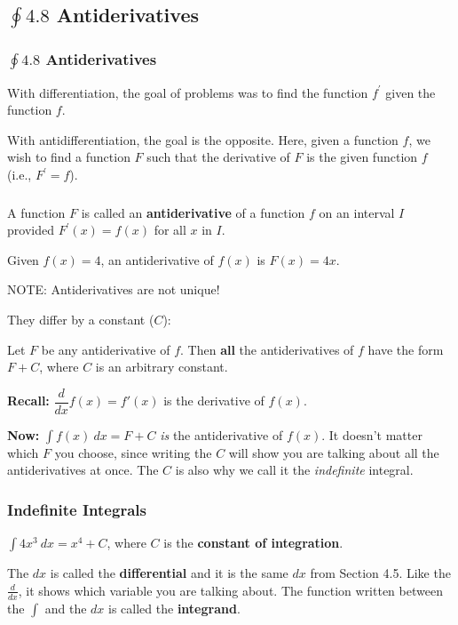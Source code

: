 \documentclass[14pt]{beamer}
\newcommand{\dint}{\displaystyle\int}
\begin{document}
\begin{frame}
\subsection[$\oint 4.8$ Antiderivatives]{$\oint 4.8$ Antiderivatives}
\frametitle{$\oint 4.8$ Antiderivatives}
\small
With differentiation, the goal of problems was to find the function $f^{\prime}$ given the function $f$.

\vspace{1pc}
With antidifferentiation, the goal is the opposite.  Here, given a function $f$, we wish to find a function $F$ such that the derivative of $F$ is the given function $f$ (i.e., $F^{\prime}=f$).
\end{frame}

\begin{frame}
\frametitle{}
\small
\begin{dfn} A function $F$ is called an {\bf antiderivative} of a function $f$ on an interval $I$ provided $F^{\prime}(x)=f(x)$ for all $x$ in $I$. \end{dfn}

\vspace{1pc}
\begin{ex} Given $f(x)=4$, an antiderivative of $f(x)$ is $F(x)=4x$.  \end{ex}

NOTE: Antiderivatives are not unique!
\end{frame}

\begin{frame}
\footnotesize
They differ by a constant ($C$):

\begin{thm}
Let $F$ be any antiderivative of $f$.  Then {\bf all} the antiderivatives of $f$ have the form $F+C$, where $C$ is an arbitrary constant.
\end{thm}

\vspace{1pc}
{\bf Recall:} $\dfrac{d}{dx} f(x)=f'(x)$ is the derivative of $f(x)$. 

\vspace{1pc}
{\bf Now:} $\dint f(x)\ dx=F+C$ \alert{\it is} the antiderivative of $f(x)$.  It doesn't matter which $F$ you choose, since writing the $C$ will show you are talking about all the antiderivatives at once.  The $C$ is also why we call it the {\it indefinite} integral.
\end{frame}

\begin{frame}
\frametitle{\small Indefinite Integrals}
\small
\begin{ex} $\dint 4x^3\ dx = x^4+C$, where $C$ is the {\bf constant of integration}. \end{ex}

\vspace{1pc}
The $dx$ is called the {\bf differential} and it is the same $dx$ from Section 4.5.  Like the $\frac{d}{dx}$, it shows which variable you are talking about.  The function written between the $\int$ and the $dx$ is called the {\bf integrand}.
\end{frame}
\end{document}
